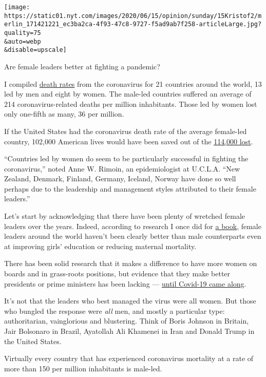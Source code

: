 \texttt{[image: https://static01.nyt.com/images/2020/06/15/opinion/sunday/15Kristof2/merlin\_171421221\_ec3ba2ca-4f93-47c8-9727-f5ad9ab7f258-articleLarge.jpg?quality=75\\\&auto=webp\\\&disable=upscale]}

Are female leaders better at fighting a pandemic?

I compiled
\href{https://ourworldindata.org/grapher/total-covid-deaths-per-million}{death
rates} from the coronavirus for 21 countries around the world, 13 led by
men and eight by women. The male-led countries suffered an average of
214 coronavirus-related deaths per million inhabitants. Those led by
women lost only one-fifth as many, 36 per million.

If the United States had the coronavirus death rate of the average
female-led country, 102,000 American lives would have been saved out of
the
\href{https://www.nytimes.com/interactive/2020/us/coronavirus-us-cases.html}{114,000
lost}.

``Countries led by women do seem to be particularly successful in
fighting the coronavirus,'' noted Anne W. Rimoin, an epidemiologist at
U.C.L.A. ``New Zealand, Denmark, Finland, Germany, Iceland, Norway have
done so well perhaps due to the leadership and management styles
attributed to their female leaders.''

Let's start by acknowledging that there have been plenty of wretched
female leaders over the years. Indeed, according to research I once did
for
\href{https://www.penguinrandomhouse.com/books/95840/half-the-sky-by-nicholas-d-kristof-and-sheryl-wudunn/}{a
book}, female leaders around the world haven't been clearly better than
male counterparts even at improving girls' education or reducing
maternal mortality.

There has been solid research that it makes a difference to have more
women on boards and in grass-roots positions, but evidence that they
make better presidents or prime ministers has been lacking ---
\href{https://www.nytimes.com/2020/05/15/world/coronavirus-women-leaders.html}{until
Covid-19 came along}.

It's not that the leaders who best managed the virus were all women. But
those who bungled the response were \emph{all} men, and mostly a
particular type: authoritarian, vainglorious and blustering. Think of
Boris Johnson in Britain, Jair Bolsonaro in Brazil, Ayatollah Ali
Khamenei in Iran and Donald Trump in the United States.

Virtually every country that has experienced coronavirus mortality at a
rate of more than 150 per million inhabitants is male-led.

